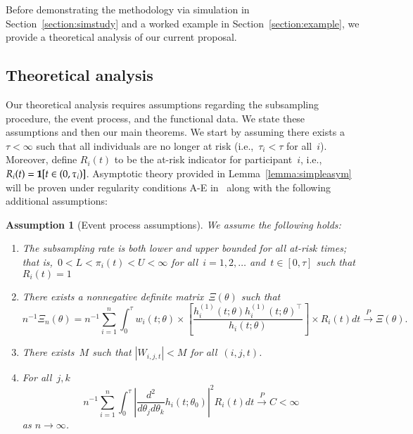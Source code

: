 \documentclass[11pt]{amsart}
\newtheorem{assumption}[thm]{Assumption}
\begin{document}
\noindent Before demonstrating the methodology via simulation in Section~\ref{section:simstudy} and a worked example in Section~\ref{section:example}, we provide a theoretical analysis of our current proposal.


\subsection{Theoretical analysis}

Our theoretical analysis requires assumptions regarding the subsampling procedure, the event process, and the functional data. We state these assumptions and then our main theorems. We start by assuming there exists a~$\tau < \infty$ such that all individuals are no longer at risk (i.e.,~$\tau_i < \tau$ for all~$i$). Moreover, define $R_i (t)$ to be the at-risk indicator for participant~$i$, i.e., $R_i (t) = {\bf 1} [t \in (0,\tau_i)]$. Asymptotic theory provided in Lemma~\ref{lemma:simpleasym} will be proven under regularity conditions A-E in~\cite[pp. 420--421]{Andersen1993} along with the following additional assumptions:

\begin{assumption}[Event process assumptions]
\label{assumption:events}\normalfont
We assume the following holds:
\begin{enumerate}[label=(E.\arabic*)]
\item\label{E1} The subsampling rate is both lower and upper bounded for all at-risk times; that is,~$0 < L < \pi_i (t) < U < \infty$ for all~$i=1,2,\ldots$ and~$t \in [0,\tau]$ such that $R_i (t) = 1$
\item\label{E2} There exists a nonnegative definite matrix~$\Xi (\theta)$ such that
  \[
    n^{-1} \Xi_n (\theta) = n^{-1} \sum_{i=1}^n \int_0^\tau w_i (t; \theta) \times \left[ \frac{h_i^{(1)}(t; \theta) h_i^{(1)} (t;\theta)^\top}{h_i (t; \theta)} \right] \times   R_i (t) dt \overset{P}{\to} \Xi (\theta).
  \]
\item\label{E3} There exists~$M$ such that $|W_{i,j,t}| < M$ for all~$(i,j,t)$.
\item\label{E4} For all~$j,k$
\[
n^{-1} \sum_{i=1}^n \int_0^\tau \left | \frac{d^2}{d\theta_j
    d\theta_k} h_i (t;\theta_0) \right|^2 R_i (t) dt \overset{P}{\to}
C < \infty
\]
as $n \to \infty$.
\end{enumerate}
\end{assumption}
\end{document}

